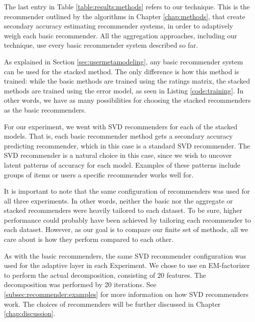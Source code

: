 The last entry in Table \ref{table:results:methods}
refers to our technique. 
This is the recommender outlined by the algorithms
in Chapter \ref{chap:methods},
that create secondary accuracy estimating recommender systems,
in order to adaptively weigh each basic recommender.
All the aggregation approaches, including our technique,
use every basic recommender system described so far.

As explained in Section \ref{sec:usermetamodeling},
any basic recommender system can be used for the stacked method.
The only difference is how this method is trained:
while the basic methods are trained using the ratings matrix,
the stacked methods are trained using the error model,
as seen in Listing \ref{code:training}.
In other words, we have as many possibilities for choosing
the stacked recommenders as the basic recommenders.

For our experiment, we went with SVD recommenders
for each of the stacked models.
That is, each basic recommender method gets a secondary 
accuracy predicting recommender, which in this case is a 
standard SVD recommender.
The SVD recommender is a natural choice in this case,
since we wish to uncover latent patterns of accuracy
for each model.
Examples of these patterns include groups of items
or users a specific recommender works well for.

It is important to note that the same configuration of recommenders was used for all three experiments.
In other words, neither the basic nor the aggregate or stacked recommenders were heavily tailored
to each dataset. To be sure, higher performance could probably have been achieved
by tailoring each recommender to each dataset. However,
as our goal is to compare our finite set of methods, all we care 
about is how they perform compared to each other.

As with the basic recommenders, the same SVD recommender configuration was used 
for the adaptive layer in each Experiment.
We chose to use en EM-factorizer to perform the actual decomposition,
consisting of 20 features. The decomposition was performed by 20 iterations.
See \ref{subsec:recommender:examples} for more information on how SVD recommenders work. 
The choices of recommenders will be further discussed
in Chapter \ref{chap:discussion}.

